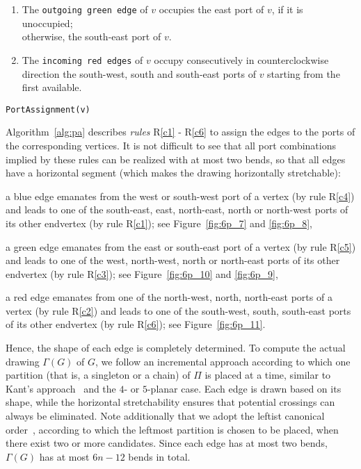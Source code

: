 \documentclass[a4paper,twoside,11pt]{article}
\begin{document}
\begin{algorithm}[t!]
\begin{enumerate}[{R}1:]
\medskip

\item \label{c5} The \texttt{outgoing green edge} of $v$ occupies
the east port of $v$, if it is unoccupied;\\otherwise, the
south-east port of $v$.

\medskip

\item \label{c6} The \texttt{incoming red edges} of $v$ occupy
consecutively in counterclockwise direction the south-west, south
and south-east ports of $v$ starting from the first available.
\end{enumerate}
\caption{\texttt{PortAssignment(v)}} 
\label{alg:pa}
\end{algorithm}

Algorithm~\ref{alg:pa} describes \emph{rules} R\ref{c1} - R\ref{c6}
to assign the edges to the ports of the corresponding vertices. It
is not difficult to see that all port combinations implied by these
rules can be realized with at most two bends, so that all edges have
a horizontal segment (which makes the drawing horizontally
stretchable):
\begin{inparaenum}[(i)]
\item a blue edge emanates from the west or south-west port of a
vertex (by rule R\ref{c4}) and leads to one of the
south-east, east, north-east, north or north-west ports of its
other endvertex (by rule R\ref{c1}); see
Figure~\ref{fig:6p_7} and \ref{fig:6p_8},
\item a green edge emanates from the east or south-east port of a
vertex (by rule R\ref{c5}) and leads to one of the
west, north-west, north or north-east ports of its other endvertex
(by rule R\ref{c3}); see Figure~\ref{fig:6p_10} and
\ref{fig:6p_9},
\item a red edge emanates from one of the north-west, north,
north-east ports of a vertex (by rule R\ref{c2}) and
leads to one of the south-west, south, south-east ports of its
other endvertex (by rule R\ref{c6}); see
Figure~\ref{fig:6p_11}.
\end{inparaenum}

Hence, the shape of each edge is completely determined. To compute
the actual drawing $\Gamma(G)$ of $G$, we follow an incremental
approach according to which one partition (that is, a singleton or a
chain) of $\Pi$ is placed at a time, similar to Kant's
approach~\cite{Kant92b} and the $4$- or $5$-planar case. Each edge is
drawn based on its shape, while the horizontal stretchability ensures
that potential crossings can always be eliminated.  Note additionally
that we adopt the leftist canonical order~\cite{BBC11}, according to
which the leftmost partition is chosen to be placed, when there exist
two or more candidates. Since each edge has at most two bends,
$\Gamma(G)$ has at most $6n-12$ bends in total.
\end{document}
